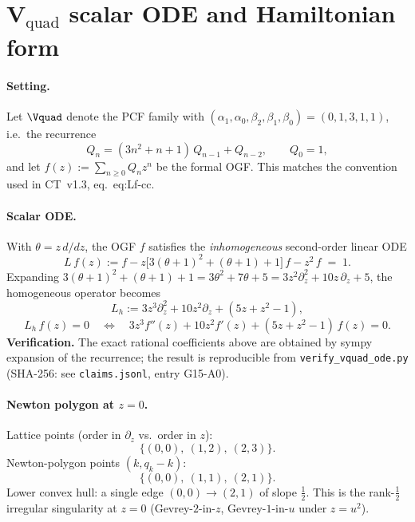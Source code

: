 %

\section*{V$_\mathrm{quad}$ scalar ODE and Hamiltonian form}
\label{sec:vquad-ham}

\paragraph{Setting.}
Let $\Vquad$ denote the PCF family with
$(\alpha_1,\alpha_0,\beta_2,\beta_1,\beta_0)=(0,1,3,1,1)$, i.e.\
the recurrence
\[
  Q_n = (3 n^2 + n + 1)\,Q_{n-1} + Q_{n-2}, \qquad Q_0 = 1,
\]
and let $f(z) := \sum_{n\ge 0} Q_n z^n$ be the formal OGF.
This matches the convention used in CT~v1.3, eq.~\textsf{eq:Lf-cc}.

\paragraph{Scalar ODE.}
With $\theta = z \, d/dz$, the OGF $f$ satisfies the
\emph{inhomogeneous} second-order linear ODE
\[
  \boxed{\;
    L\,f(z) := f - z\bigl[3(\theta+1)^2+(\theta+1)+1\bigr]\,f
            - z^2\,f \;=\; 1.\;}
\]
Expanding
$3(\theta+1)^2+(\theta+1)+1 = 3\theta^2+7\theta+5
 = 3 z^2 \partial_z^2 + 10 z\, \partial_z + 5$,
the homogeneous operator becomes
\[
  L_h := 3 z^3 \partial_z^2 + 10 z^2 \partial_z + (5z + z^2 - 1),
\]
\[
  \boxed{\;
    L_h\,f(z) = 0
    \quad\Longleftrightarrow\quad
    3 z^3 f''(z) + 10 z^2 f'(z) + (5z + z^2 - 1)\,f(z) = 0.
    \;}
\]
\textbf{Verification.} The exact rational coefficients above
are obtained by sympy expansion of the recurrence; the result
is reproducible from \texttt{verify\_vquad\_ode.py}
(SHA-256: see \texttt{claims.jsonl}, entry \textsf{G15-A0}).

\paragraph{Newton polygon at $z=0$.}
Lattice points (order in $\partial_z$ vs.\ order in $z$):
\[
  \{(0,0),\ (1,2),\ (2,3)\}.
\]
Newton-polygon points $(k, q_k - k)$:
\[
  \{(0,0),\ (1,1),\ (2,1)\}.
\]
Lower convex hull: a single edge $(0,0)\to(2,1)$ of slope
$\tfrac{1}{2}$. This is the rank-$\tfrac{1}{2}$ irregular
singularity at $z=0$ (Gevrey-$2$-in-$z$, Gevrey-$1$-in-$u$
under $z = u^2$).

